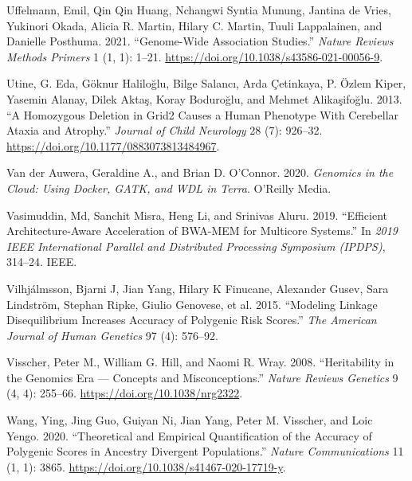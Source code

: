 \documentclass[
]{book}
\newlength{\cslhangindent}
\newlength{\cslentryspacingunit} %
\newenvironment{CSLReferences}[2] %
 {%
  \setlength{\parindent}{0pt}
  \ifodd #1
  \let\oldpar\par
  \def\par{\hangindent=\cslhangindent\oldpar}
  \fi
  \setlength{\parskip}{#2\cslentryspacingunit}
 }%
 {}
\begin{document}
\begin{CSLReferences}{1}{0}
\leavevmode{}%
Uffelmann, Emil, Qin Qin Huang, Nchangwi Syntia Munung, Jantina de Vries, Yukinori Okada, Alicia R. Martin, Hilary C. Martin, Tuuli Lappalainen, and Danielle Posthuma. 2021. {``Genome-Wide Association Studies.''} \emph{Nature Reviews Methods Primers} 1 (1, 1): 1--21. \url{https://doi.org/10.1038/s43586-021-00056-9}.

\leavevmode{}%
Utine, G. Eda, Göknur Haliloğlu, Bilge Salancı, Arda Çetinkaya, P. Özlem Kiper, Yasemin Alanay, Dilek Aktaş, Koray Boduroğlu, and Mehmet Alikaşifoğlu. 2013. {``A {Homozygous Deletion} in {Grid2 Causes} a {Human Phenotype With Cerebellar Ataxia} and {Atrophy}.''} \emph{Journal of Child Neurology} 28 (7): 926--32. \url{https://doi.org/10.1177/0883073813484967}.

\leavevmode{}%
Van der Auwera, Geraldine A., and Brian D. O'Connor. 2020. \emph{Genomics in the Cloud: Using {Docker}, {GATK}, and {WDL} in {Terra}}. {O'Reilly Media}.

\leavevmode{}%
Vasimuddin, Md, Sanchit Misra, Heng Li, and Srinivas Aluru. 2019. {``Efficient Architecture-Aware Acceleration of {BWA-MEM} for Multicore Systems.''} In \emph{2019 {IEEE International Parallel} and {Distributed Processing Symposium} ({IPDPS})}, 314--24. {IEEE}.

\leavevmode{}%
Vilhjálmsson, Bjarni J, Jian Yang, Hilary K Finucane, Alexander Gusev, Sara Lindström, Stephan Ripke, Giulio Genovese, et al. 2015. {``Modeling Linkage Disequilibrium Increases Accuracy of Polygenic Risk Scores.''} \emph{The American Journal of Human Genetics} 97 (4): 576--92.

\leavevmode{}%
Visscher, Peter M., William G. Hill, and Naomi R. Wray. 2008. {``Heritability in the Genomics Era --- Concepts and Misconceptions.''} \emph{Nature Reviews Genetics} 9 (4, 4): 255--66. \url{https://doi.org/10.1038/nrg2322}.

\leavevmode{}%
Wang, Ying, Jing Guo, Guiyan Ni, Jian Yang, Peter M. Visscher, and Loic Yengo. 2020. {``Theoretical and Empirical Quantification of the Accuracy of Polygenic Scores in Ancestry Divergent Populations.''} \emph{Nature Communications} 11 (1, 1): 3865. \url{https://doi.org/10.1038/s41467-020-17719-y}.


\end{CSLReferences}
\end{document}
